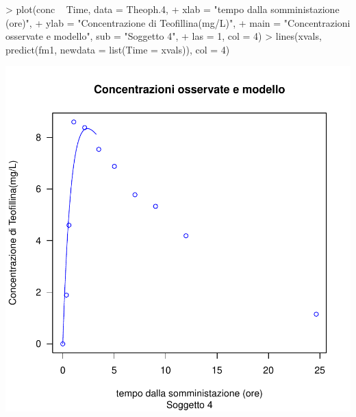 \documentclass[onecolumn,11pt]{book}
\begin{document}
\begin{Schunk}
\begin{Sinput}
> plot(conc ~ Time, data = Theoph.4,
+ xlab = "tempo dalla somministazione (ore)",
+ ylab = "Concentrazione di Teofillina(mg/L)", 
+ main = "Concentrazioni osservate e modello", sub = "Soggetto 4",
+ las = 1, col = 4)
> lines(xvals, predict(fm1, newdata = list(Time = xvals)), col = 4)
\end{Sinput}
\end{Schunk}
\includegraphics{statisticaconR-323}
\end{document}
